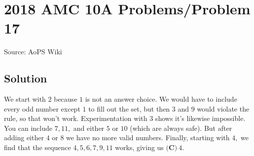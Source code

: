 \documentclass[12pt]{article}
\begin{document}
\section*{{2018 AMC 10A Problems/Problem 17}}
Source: AoPS Wiki

\subsection*{Solution}
We start with $2$ because $1$ is not an answer choice. We would have to include every odd number except $1$ to fill out the set, but then $3$ and $9$ would violate the rule, so that won't work. Experimentation with $3$ shows it's likewise impossible. You can include $7,11,$ and either $5$ or $10$ (which are always safe). But after adding either $4$ or $8$ we have no more valid numbers. Finally, starting with $4,$ we find that the sequence $4,5,6,7,9,11$ works, giving us $\boxed{\textbf{(C)}\ 4}.$
\end{document}
